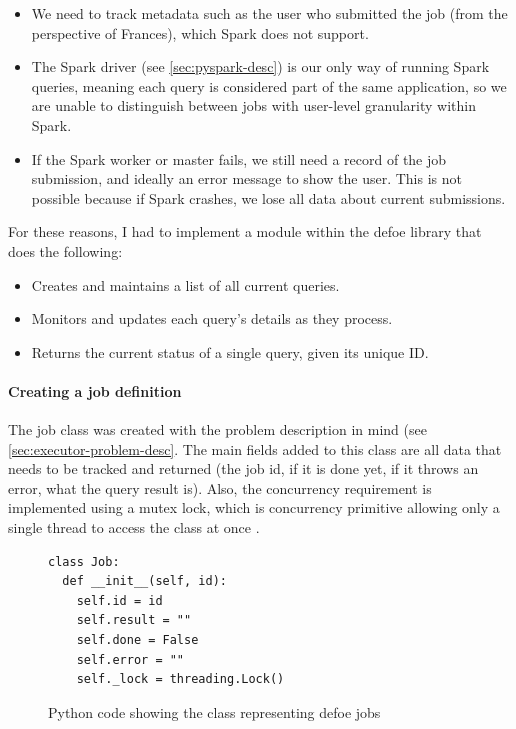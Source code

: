 \documentclass[12pt, letterpaper]{article}
\begin{document}
\begin{itemize}
\item We need to track metadata such as the user who submitted the job (from the perspective of Frances), which Spark does not support.
\item The Spark driver (see \ref{sec:pyspark-desc}) is our only way of running Spark queries, meaning each query is considered part of the same application, so we are unable to distinguish between jobs with user-level granularity within Spark.
\item If the Spark worker or master fails, we still need a record of the job submission, and ideally an error message to show the user. This is not possible because if Spark crashes, we lose all data about current submissions.
\end{itemize}

\begin{flushleft}
For these reasons, I had to implement a module within the defoe library that does the following:
\end{flushleft}

\begin{itemize}
\item Creates and maintains a list of all current queries.
\item Monitors and updates each query's details as they process.
\item Returns the current status of a single query, given its unique ID.
\end{itemize}

\paragraph{Creating a job definition}\label{sec:job-definition}

\begin{flushleft}
The job class was created with the problem description in mind (see \ref{sec:executor-problem-desc}. The main fields added to this class are all data that needs to be tracked and returned (the job id, if it is done yet, if it throws an error, what the query result is). Also, the concurrency requirement is implemented using a mutex lock, which is concurrency primitive allowing only a single thread to access the class at once \cite{mutex-lock}.
\end{flushleft}

\begin{flushleft}
\begin{figure}[H]
\begin{verbatim}
class Job:
  def __init__(self, id):
    self.id = id
    self.result = ""
    self.done = False
    self.error = ""
    self._lock = threading.Lock()
\end{verbatim}
\caption{Python code showing the class representing defoe jobs}
\end{figure}
\end{flushleft}
\end{document}
